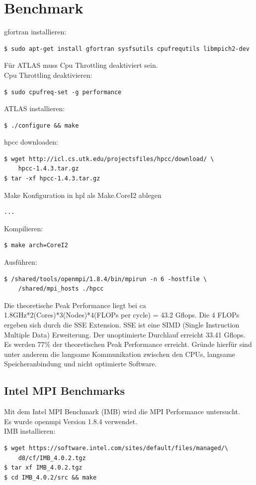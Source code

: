\chapter{Benchmark}
gfortran installieren:
\begin{lstlisting}[style=Bash]
$ sudo apt-get install gfortran sysfsutils cpufrequtils libmpich2-dev
\end{lstlisting}
Für ATLAS muss Cpu Throttling deaktiviert sein.\\
Cpu Throttling deaktivieren: 
\begin{lstlisting}[style=Bash]
$ sudo cpufreq-set -g performance
\end{lstlisting}
ATLAS installieren:
\begin{lstlisting}[style=Bash]
$ ./configure && make
\end{lstlisting}
hpcc downloaden:
\begin{lstlisting}[style=Bash]
$ wget http://icl.cs.utk.edu/projectsfiles/hpcc/download/ \
	hpcc-1.4.3.tar.gz
$ tar -xf hpcc-1.4.3.tar.gz
\end{lstlisting}
Make Konfiguration in hpl als Make.CoreI2 ablegen
\begin{lstlisting}[style=Bash]
...
\end{lstlisting}
Kompilieren:
\begin{lstlisting}[style=Bash]
$ make arch=CoreI2
\end{lstlisting}
Ausführen:
\begin{lstlisting}[style=Bash]
$ /shared/tools/openmpi/1.8.4/bin/mpirun -n 6 -hostfile \
	/shared/mpi_hosts ./hpcc
\end{lstlisting}
Die theoretische Peak Performance liegt bei ca 1.8GHz*2(Cores)*3(Nodes)*4(FLOPs per cycle) = 43.2 Gflops.
Die 4 FLOPs ergeben sich durch die SSE Extension. SSE ist eine SIMD (Single Instruction Multiple Data) Erweiterung.
Der unoptimierte Durchlauf erreicht 33.41 Gflops. Es werden 77\% der theoretischen Peak Performance erreicht.
Gründe hierfür sind unter anderem die langsame Kommunikation zwischen den CPUs, langsame Speicheranbindung und nicht optimierte Software.\\
\section{Intel MPI Benchmarks}
Mit dem Intel MPI Benchmark (IMB) wird die MPI Performance untersucht.\\
Es wurde openmpi Version 1.8.4 verwendet.\\
IMB installieren:
\begin{lstlisting}[style=Bash]
$ wget https://software.intel.com/sites/default/files/managed/\
	d8/cf/IMB_4.0.2.tgz
$ tar xf IMB_4.0.2.tgz
$ cd IMB_4.0.2/src && make
\end{lstlisting}
